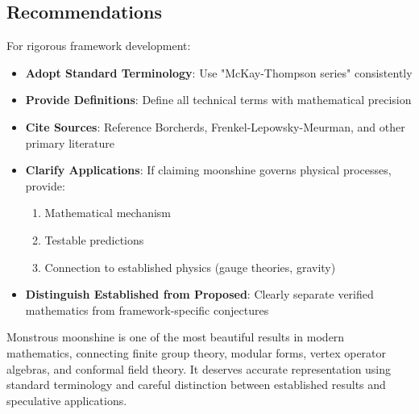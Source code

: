 \subsection{Recommendations}

For rigorous framework development:
\begin{itemize}
    \item \textbf{Adopt Standard Terminology}: Use "McKay-Thompson series" consistently
    \item \textbf{Provide Definitions}: Define all technical terms with mathematical precision
    \item \textbf{Cite Sources}: Reference Borcherds, Frenkel-Lepowsky-Meurman, and other primary literature
    \item \textbf{Clarify Applications}: If claiming moonshine governs physical processes, provide:
    \begin{enumerate}
        \item Mathematical mechanism
        \item Testable predictions
        \item Connection to established physics (gauge theories, gravity)
    \end{enumerate}
    \item \textbf{Distinguish Established from Proposed}: Clearly separate verified mathematics from framework-specific conjectures
\end{itemize}

Monstrous moonshine is one of the most beautiful results in modern mathematics, connecting finite group theory, modular forms, vertex operator algebras, and conformal field theory. It deserves accurate representation using standard terminology and careful distinction between established results and speculative applications.
